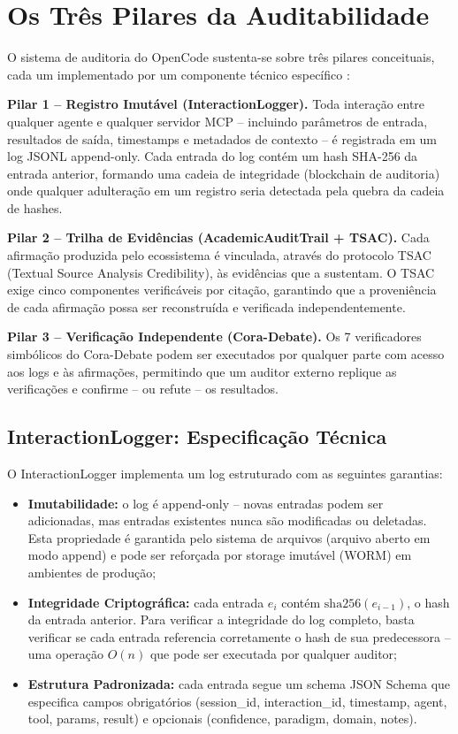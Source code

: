 \documentclass[12pt,a4paper,sumario=tradicional,openany]{abntex2}
\begin{document}
\section{Os Três Pilares da Auditabilidade}

O sistema de auditoria do OpenCode sustenta-se sobre três pilares conceituais, cada um implementado por um componente técnico específico \cite{pudasaini2024survey, eslit2025ai}:

\textbf{Pilar 1 -- Registro Imutável (InteractionLogger).} Toda interação entre qualquer agente e qualquer servidor MCP -- incluindo parâmetros de entrada, resultados de saída, timestamps e metadados de contexto -- é registrada em um log JSONL append-only. Cada entrada do log contém um hash SHA-256 da entrada anterior, formando uma cadeia de integridade (blockchain de auditoria) onde qualquer adulteração em um registro seria detectada pela quebra da cadeia de hashes.

\textbf{Pilar 2 -- Trilha de Evidências (AcademicAuditTrail + TSAC).} Cada afirmação produzida pelo ecossistema é vinculada, através do protocolo TSAC (Textual Source Analysis Credibility), às evidências que a sustentam. O TSAC exige cinco componentes verificáveis por citação, garantindo que a proveniência de cada afirmação possa ser reconstruída e verificada independentemente.

\textbf{Pilar 3 -- Verificação Independente (Cora-Debate).} Os 7 verificadores simbólicos do Cora-Debate podem ser executados por qualquer parte com acesso aos logs e às afirmações, permitindo que um auditor externo replique as verificações e confirme -- ou refute -- os resultados.

\subsection{InteractionLogger: Especificação Técnica}

O InteractionLogger implementa um log estruturado com as seguintes garantias:

\begin{itemize}
    \item \textbf{Imutabilidade:} o log é append-only -- novas entradas podem ser adicionadas, mas entradas existentes nunca são modificadas ou deletadas. Esta propriedade é garantida pelo sistema de arquivos (arquivo aberto em modo append) e pode ser reforçada por storage imutável (WORM) em ambientes de produção;
    \item \textbf{Integridade Criptográfica:} cada entrada $e_i$ contém $\text{sha256}(e_{i-1})$, o hash da entrada anterior. Para verificar a integridade do log completo, basta verificar se cada entrada referencia corretamente o hash de sua predecessora -- uma operação $O(n)$ que pode ser executada por qualquer auditor;
    \item \textbf{Estrutura Padronizada:} cada entrada segue um schema JSON Schema que especifica campos obrigatórios (session\_id, interaction\_id, timestamp, agent, tool, params, result) e opcionais (confidence, paradigm, domain, notes).
\end{itemize}
\end{document}
